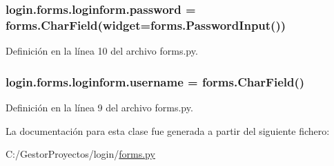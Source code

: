 \subsubsection[{\texorpdfstring{password}{password}}]{\setlength{\rightskip}{0pt plus 5cm}login.\+forms.\+loginform.\+password = forms.\+Char\+Field(widget=forms.\+Password\+Input())\hspace{0.3cm}{\ttfamily [static]}}\hypertarget{classlogin_1_1forms_1_1loginform_a5ef2fe1a9fad254fe4246fb24bdd6850}{}\label{classlogin_1_1forms_1_1loginform_a5ef2fe1a9fad254fe4246fb24bdd6850}


Definición en la línea 10 del archivo forms.\+py.

\subsubsection[{\texorpdfstring{username}{username}}]{\setlength{\rightskip}{0pt plus 5cm}login.\+forms.\+loginform.\+username = forms.\+Char\+Field()\hspace{0.3cm}{\ttfamily [static]}}\hypertarget{classlogin_1_1forms_1_1loginform_af34b8fea30fba76707157184bdb0fe04}{}\label{classlogin_1_1forms_1_1loginform_af34b8fea30fba76707157184bdb0fe04}


Definición en la línea 9 del archivo forms.\+py.



La documentación para esta clase fue generada a partir del siguiente fichero\+:\begin{DoxyCompactItemize}
\item 
C\+:/\+Gestor\+Proyectos/login/\hyperlink{login_2forms_8py}{forms.\+py}\end{DoxyCompactItemize}
